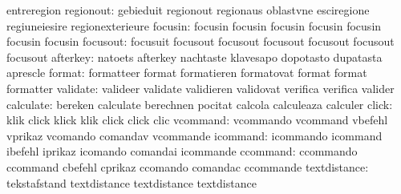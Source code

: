                            entreregion
                regionout: gebieduit                 regionout
                           regionaus                 oblastvne
                           esciregione               regiuneiesire
                           regionexterieure
                  focusin: focusin                   focusin
                           focusin                   focusin
                           focusin                   focusin
                           focusin
                 focusout: focusuit                  focusout
                           focusout                  focusout
                           focusout                  focusout
                           focusout
                 afterkey: natoets                   afterkey
                           nachtaste                 klavesapo
                           dopotasto                 dupatasta
                           aprescle
                   format: formatteer                format
                           formatieren               formatovat
                           format                    format
                           formatter
                 validate: valideer                  validate
                           validieren                validovat
                           verifica                  verifica
                           valider
                calculate: bereken                   calculate
                           berechnen                 pocitat
                           calcola                   calculeaza
                           calculer
                    click: klik                      click
                           klick                     klik
                           click                     click
                           clic
                 vcommand: vcommando                 vcommand
                           vbefehl                   vprikaz
                           vcomando                  comandav
                           vcommande
                 icommand: icommando                 icommand
                           ibefehl                   iprikaz
                           icomando                  comandai
                           icommande
                 ccommand: ccommando                 ccommand
                           cbefehl                   cprikaz
                           ccomando                  comandac
                           ccommande
             textdistance: tekstafstand              textdistance
                           textdistance              textdistance
